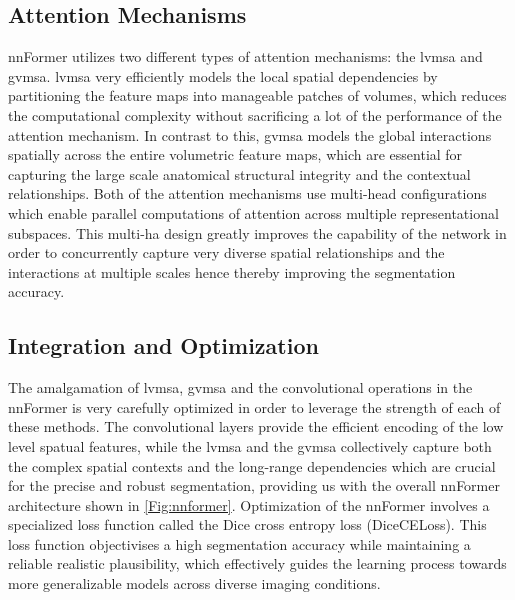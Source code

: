 \subsection{Attention Mechanisms}
nnFormer utilizes two different types of attention mechanisms: the \gls{lvmsa} and \gls{gvmsa}. \gls{lvmsa} very efficiently models the local spatial dependencies by partitioning the feature maps into manageable patches of volumes, which reduces the computational complexity without sacrificing a lot of the performance of the attention mechanism. In contrast to this, \gls{gvmsa} models the global interactions spatially across the entire volumetric feature maps, which are essential for capturing the large scale anatomical structural integrity and the contextual relationships. Both of the attention mechanisms use multi-head configurations which enable parallel computations of attention across multiple representational subspaces. This multi-ha design greatly improves the capability of the network in order to concurrently capture very diverse spatial relationships and the interactions at multiple scales hence thereby improving the segmentation accuracy.

\subsection{Integration and Optimization}
The amalgamation of \gls{lvmsa}, \gls{gvmsa} and the convolutional operations in the nnFormer is very carefully optimized in order to leverage the strength of each of these methods. The convolutional layers provide the efficient encoding of the low level spatual features, while the \gls{lvmsa} and the \gls{gvmsa} collectively capture both the complex spatial contexts and the long-range dependencies which are crucial for the precise and robust segmentation, providing us with the overall nnFormer architecture shown in \cref{Fig:nnformer}. Optimization of the nnFormer involves a specialized loss function called the Dice cross entropy loss (DiceCELoss). This loss function objectivises a high segmentation accuracy while maintaining a reliable realistic plausibility, which effectively guides the learning process towards more generalizable models across diverse imaging conditions.

